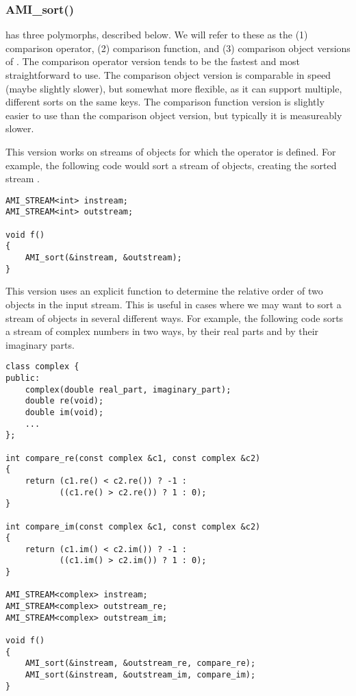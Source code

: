 \subsubsection{AMI\_sort()}
 has three polymorphs, described below.
We will refer to these as the (1) comparison operator, (2)
comparison function, and (3) comparison object versions of
. The comparison operator version tends to
be the fastest and most straightforward to use. The
comparison object version is comparable in speed (maybe
slightly slower), but somewhat more flexible, as it can support
multiple, different sorts on the same keys. The comparison
function version is slightly easier to use than the
comparison object version, but typically it is measureably slower.

 This version works on streams of
objects for which the operator \myverb{<} is defined. For
example, the following code would sort a stream
 of  objects, creating the sorted
stream .

\begin{verbatim}
AMI_STREAM<int> instream;
AMI_STREAM<int> outstream;

void f()
{
    AMI_sort(&instream, &outstream);
}
\end{verbatim}

This version uses an explicit function to
determine the relative order of two objects in the input stream.  This
is useful in cases where we may want to sort a stream of objects in
several different ways.  For example, the following code sorts a
stream of complex numbers in two ways, by their real parts and by
their imaginary parts.

\begin{verbatim}
class complex {
public:
    complex(double real_part, imaginary_part);
    double re(void);
    double im(void);
    ...
};

int compare_re(const complex &c1, const complex &c2)
{
    return (c1.re() < c2.re()) ? -1 :
           ((c1.re() > c2.re()) ? 1 : 0);
}

int compare_im(const complex &c1, const complex &c2)
{
    return (c1.im() < c2.im()) ? -1 :
           ((c1.im() > c2.im()) ? 1 : 0);
}

AMI_STREAM<complex> instream;
AMI_STREAM<complex> outstream_re;
AMI_STREAM<complex> outstream_im;

void f()
{
    AMI_sort(&instream, &outstream_re, compare_re);
    AMI_sort(&instream, &outstream_im, compare_im);
}
\end{verbatim}


